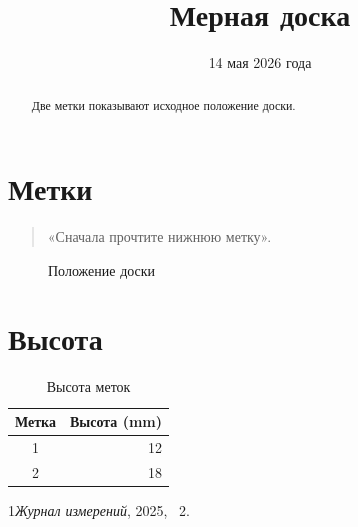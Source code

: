 \documentclass{article}
\begin{document}
\title{Мерная доска}\author{}\date{14 мая 2026 года}\maketitle
\begin{abstract}Две метки показывают исходное положение доски.\end{abstract}
\tableofcontents
\section{Метки}\begin{quote}«Сначала прочтите нижнюю метку».\end{quote}
\begin{figure}[ht]\centering\fbox{\rule{0pt}{8mm}\rule{33mm}{0pt}}\caption{Положение доски}\end{figure}
\section{Высота}
\begin{table}[ht]\centering\begin{tabular}{cr}Метка&Высота (mm)\\\hline 1&12\\2&18\end{tabular}\caption{Высота меток}\end{table}
\begin{thebibliography}{1}\emph{Журнал измерений}, 2025, \chaptername~2.\end{thebibliography}
\end{document}
